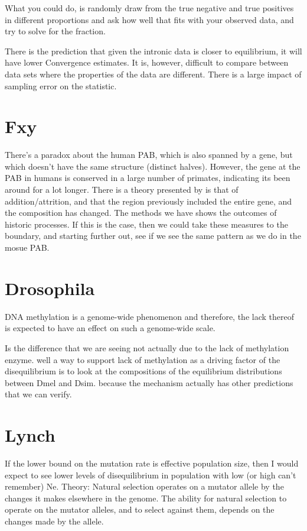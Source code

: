 What you could do, is randomly draw from the true negative and true positives in different proportions and ask how well that fits with your observed data, and try to solve for the fraction. 

There is the prediction that given the intronic data is closer to equilibrium, it will have  lower Convergence estimates. It is, however, difficult to compare between data sets where the properties of the data are different. There is a large impact of sampling error on the statistic. 



\section{Fxy}
There's a paradox about the human PAB, which is also spanned by a gene, but which doesn't have the same structure (distinct halves). However, the gene at the PAB in humans is conserved in a large number of primates, indicating its been around for a lot longer. There is a theory presented by \cite{Galtier2004RecombinationParadox} is that of addition/attrition, and that the region previously included the entire gene, and the composition has changed. The methods we have shows the outcomes of historic processes. If this is the case, then we could take these measures to the boundary, and starting further out, see if we see the same pattern as we do in the mosue PAB. 



\section{Drosophila}

 DNA methylation is a genome-wide phenomenon and therefore, the lack thereof is expected to have an effect on such a genome-wide scale.  
 
 
 Is the difference that we are seeing not actually due to the lack of methylation enzyme. well a way to support lack of methylation as a driving factor of the disequilibrium is to look at the compositions of the equilibrium distributions between Dmel and Dsim. because the mechanism actually has other predictions that we can verify. 

\section{Lynch}

If the lower bound on the mutation rate is effective population size, then I would expect to see lower levels of disequilibrium in population with low (or high can't remember) Ne. 
Theory: Natural selection operates on a mutator allele by the changes it makes elsewhere in the genome. 
The ability for natural selection to operate on the mutator alleles, and to select against them, depends on the changes made by the allele. 


